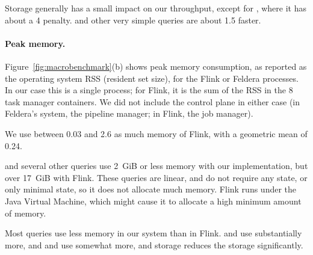 Storage generally has a small impact on our throughput, except for
, where it has about a 4\x{} penalty.   and other
very simple queries are about 1.5\x{} faster.

\paragraph{Peak memory.}

Figure~\ref{fig:macrobenchmark}(b) shows peak memory consumption, as
reported as the operating system RSS (resident set size), for the
Flink or Feldera processes.  In our case this is a single process; for
Flink, it is the sum of the RSS in the 8 task manager containers.  We
did not include the control plane in either case (in Feldera's system,
the pipeline manager; in Flink, the job manager).

We use between 0.03\x{} and 2.6\x{} as much memory of Flink, with a
geometric mean of 0.24\x{}.

 and several other queries use 2~GiB or less memory with our
implementation, but over 17~GiB with Flink.  These queries are linear,
and do not require any state, or only minimal state, so it does not
allocate much memory.  Flink runs under the Java Virtual Machine,
which might cause it to allocate a high minimum amount of memory.

Most queries use less memory in our system than in Flink.  
and  use substantially more, and  and
 use somewhat more, and storage reduces the storage
significantly.
